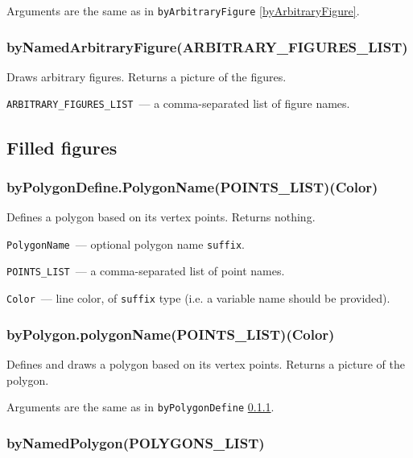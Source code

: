 	Arguments are the same as in \texttt{byArbitraryFigure} \ref{byArbitraryFigure}.

\subsubsection{byNamedArbitraryFigure(ARBITRARY\_FIGURES\_LIST)}\label{byNamedArbitraryFigure}

	Draws arbitrary figures. Returns a picture of the figures.
	
	\texttt{ARBITRARY\_FIGURES\_LIST}~— a comma-separated list of figure names.


\subsection{Filled figures}


\subsubsection{byPolygonDefine.PolygonName(POINTS\_LIST)(Color)}\label{byPolygonDefine}

	Defines a polygon based on its vertex points. Returns nothing.
	
	\texttt{PolygonName}~— optional polygon name \texttt{suffix}.
	
	\texttt{POINTS\_LIST}~— a comma-separated list of point names.
	
	\texttt{Color}~— line color, of \texttt{suffix} type (i.e. a variable name should be provided).


\subsubsection{byPolygon.polygonName(POINTS\_LIST)(Color)}\label{byPolygon}

	Defines and draws a polygon based on its vertex points. Returns a picture of the polygon.
	
	Arguments are the same as in \texttt{byPolygonDefine} \ref{byPolygonDefine}.


\subsubsection{byNamedPolygon(POLYGONS\_LIST)}\label{byNamedPolygon}
	
